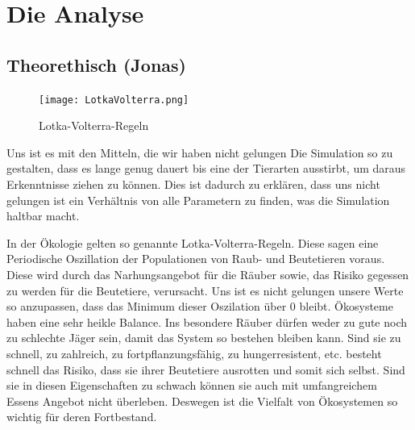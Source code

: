 \documentclass[12pt]{article}
\begin{document}
\section{Die Analyse}
\subsection{Theorethisch (Jonas)}

\begin{figure}
        \centering
        \texttt{[image: LotkaVolterra.png]}
        \caption{Lotka-Volterra-Regeln \label{overflow}}
\end{figure}
Uns ist es mit den Mitteln, die wir haben nicht gelungen Die Simulation so zu gestalten, dass es lange genug dauert bis eine der Tierarten ausstirbt, um daraus Erkenntnisse ziehen zu können.
Dies ist dadurch zu erklären, dass uns nicht gelungen ist ein Verhältnis von alle Parametern zu finden, was die Simulation haltbar macht.

In der Ökologie gelten so genannte Lotka-Volterra-Regeln.
Diese sagen eine Periodische Oszillation der Populationen von Raub- und Beutetieren voraus.
Diese wird durch das Narhungsangebot für die Räuber sowie, das Risiko gegessen zu werden für die Beutetiere, verursacht.
Uns ist es nicht gelungen unsere Werte so anzupassen, dass das Minimum dieser Oszilation über 0 bleibt.
Ökosysteme haben eine sehr heikle Balance.
Ins besondere Räuber dürfen weder zu gute noch zu schlechte Jäger sein, damit das System so bestehen bleiben kann.
Sind sie zu schnell, zu zahlreich, zu fortpflanzungsfähig, zu hungerresistent, etc. besteht schnell das Risiko, dass sie ihrer Beutetiere ausrotten und somit sich selbst.
Sind sie in diesen Eigenschaften zu schwach können sie auch mit umfangreichem Essens Angebot nicht überleben.
Deswegen ist die Vielfalt von Ökosystemen so wichtig für deren Fortbestand.
\end{document}
